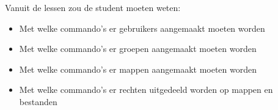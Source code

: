 Vanuit de lessen zou de student moeten weten:
\begin{itemize}
\item Met welke commando's er gebruikers aangemaakt moeten worden
\item Met welke commando's er groepen aangemaakt moeten worden
\item Met welke commando's er mappen aangemaakt moeten worden
\item Met welke commando's er rechten uitgedeeld worden op mappen en bestanden
\end{itemize}

